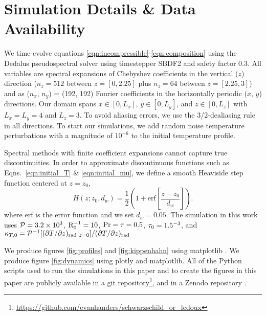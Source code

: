 \section{Simulation Details \& Data Availability}
\label{app:simulation_details}
We time-evolve equations \ref{eqn:incompressible}-\ref{eqn:composition} using the Dedalus pseudospectral solver \citep{burns_etal_2020} using timestepper SBDF2 \citep{wang_ruuth_2008} and safety factor 0.3.
All variables are spectral expansions of Chebyshev coefficients in the vertical ($z$) direction ($n_z = 512$ between $z=[0, 2.25]$ plus $n_z = 64$ between $z=[2.25, 3]$) and as ($n_x$, $n_y$) = (192, 192) Fourier coefficients in the horizontally periodic ($x$, $y$) directions.
Our domain spans $x \in [0, L_x]$, $y \in [0, L_y]$, and $z \in [0, L_z]$ with $L_x = L_y = 4$ and $L_z = 3$.
To avoid aliasing errors, we use the 3/2-dealiasing rule in all directions.
To start our simulations, we add random noise temperature perturbations with a magnitude of $10^{-6}$ to the initial temperature profile.

Spectral methods with finite coefficient expansions cannot capture true discontinuities.
In order to approximate discontinuous functions such as Eqns.~\ref{eqn:initial_T} \& \ref{eqn:initial_mu}, we define a smooth Heaviside step function centered at $z = z_0$,
\begin{equation}
H(z; z_0, d_w) = \frac{1}{2}\left(1 + \mathrm{erf}\left[\frac{z - z_0}{d_w}\right]\right).
\label{eqn:heaviside}
\end{equation}
where erf is the error function and we set $d_w = 0.05$.
The simulation in this work uses $\mathcal{P} = 3.2 \times 10^3$, $\mathrm{R}_{0}^{-1} = 10$, $\rm{Pr} = \tau = 0.5$, $\tau_0 = 1.5 \time 10^{-3}$, and ${\kappa_{T,0} = \mathcal{P}^{-1}[(\partial T/\partial z)_{\rm{rad}}|_{z=0}] / (\partial T/\partial z)_{\rm{rad}}}$

We produce figures \ref{fig:profiles} and \ref{fig:kippenhahn} using matplotlib \citep{hunter2007, mpl3.3.4}.
We produce figure \ref{fig:dynamics} using plotly \citep{plotly} and matplotlib.
All of the Python scripts used to run the simulations in this paper and to create the figures in this paper are publicly available in a git repository\footnote{\url{https://github.com/evanhanders/schwarzschild_or_ledoux}}, and in a Zenodo repository \citep{supp}.

